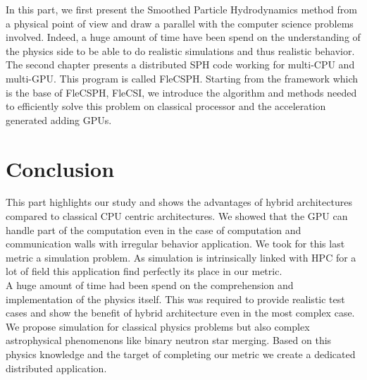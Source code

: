 In this part, we first present the Smoothed Particle Hydrodynamics method from a physical point of view and draw a parallel with the computer science problems involved. 
Indeed, a huge amount of time have been spend on the understanding of the physics side to be able to do realistic simulations and thus realistic behavior. 
The second chapter presents a distributed SPH code working for multi-CPU and multi-GPU. 
This program is called FleCSPH. 
Starting from the framework which is the base of FleCSPH, FleCSI, we introduce the algorithm and methods needed to efficiently solve this problem on classical processor and the acceleration generated adding GPUs. 







\chapter*{Conclusion}
This part highlights our study and shows the advantages of hybrid architectures compared to classical CPU centric architectures. 
We showed that the GPU can handle part of the computation even in the case of computation and communication walls with irregular behavior application. 
We took for this last metric a simulation problem. 
As simulation is intrinsically linked with HPC for a lot of field this application find perfectly its place in our metric.\\

A huge amount of time had been spend on the comprehension and implementation of the physics itself. 
This was required to provide realistic test cases and show the benefit of hybrid architecture even in the most complex case. 
We propose simulation for classical physics problems but also complex astrophysical phenomenons like binary neutron star merging. 
Based on this physics knowledge and the target of completing our metric we create a dedicated distributed application.

